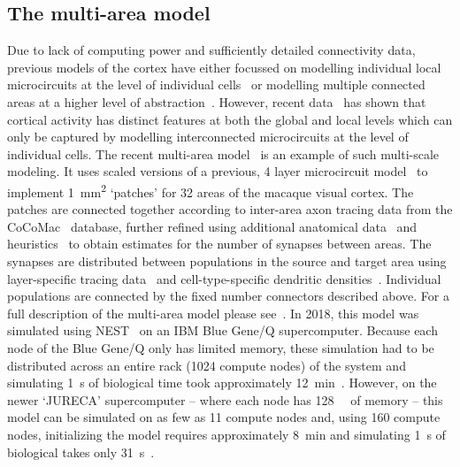\documentclass[9pt,a4paper]{amsart}
\begin{document}
\subsection{The multi-area model}
Due to lack of computing power and sufficiently detailed connectivity data, previous models of the cortex have either focussed on modelling individual local microcircuits at the level of individual cells~\citep{Izhikevich2008,Potjans2012} or modelling multiple connected areas at a higher level of abstraction~\citep{Cabral2014}.
However, recent data~\citep{Belitski2008} has shown that cortical activity has distinct features at both the global and local levels which can only be captured by modelling interconnected microcircuits at the level of individual cells.
The recent multi-area model~\citep{Schmidt2018a,Schmidt2018} is an example of such multi-scale modeling.
It uses scaled versions of a previous, 4 layer microcircuit model~\citep{Potjans2012} to implement \SI{1}{\milli\meter\squared} `patches' for 32 areas of the macaque visual cortex.
The patches are connected together according to inter-area axon tracing data from the CoCoMac~\citep{Bakker2012} database, further refined using additional anatomical data~\citep{Markov2014} and heuristics~\citep{Ercsey-Ravasz2013} to obtain estimates for the number of synapses between areas.
The synapses are distributed between populations in the source and target area using layer-specific tracing data~\citep{Markov2014b} and cell-type-specific dendritic densities~\citep{Binzegger2004}.
Individual populations are connected by the fixed number connectors described above.
For a full description of the multi-area model please see~\citet{Schmidt2018a,Schmidt2018}.
In 2018, this model was simulated using NEST~\citep{Gewaltig2007} on an IBM Blue Gene/Q supercomputer.
Because each node of the Blue Gene/Q only has limited memory, these simulation had to be distributed across an entire rack (\num{1024} compute nodes) of the system and simulating \SI{1}{\second} of biological time took approximately \SI{12}{\minute}~\citep{Schmidt2018}.
However, on the newer `JURECA' supercomputer -- where each node has \SI{128}{\giga\byte} of memory -- this model can be simulated on as few as \num{11} compute nodes and, using \num{160} compute nodes, initializing the model requires approximately \SI{8}{\minute} and simulating \SI{1}{\second} of biological takes only \SI{31}{\second}~\citep{VanAlbada2020}.
\end{document}
